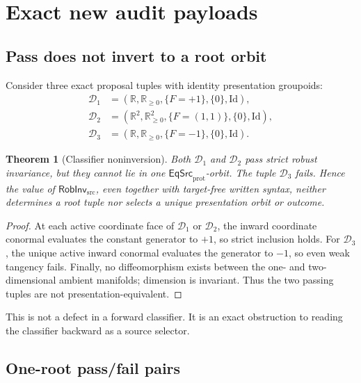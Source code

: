 \documentclass[11pt]{article}
\newtheorem{theorem}{Theorem}
\newcommand{\R}{\mathbb R}
\newcommand{\RobInv}{\mathsf{RobInv}_{\mathrm{src}}}
\newcommand{\EqSrc}{\mathsf{EqSrc}_{\mathrm{prot}}}
\begin{document}
\section{Exact new audit payloads}

\subsection{Pass does not invert to a root orbit}

Consider three exact proposal tuples with identity presentation groupoids:
\begin{align*}
 \mathcal D_1&=(\R,\R_{\geq0},\{F=+1\},\{0\},\mathrm{Id}),\\
 \mathcal D_2&=(\R^2,\R_{\geq0}^2,\{F=(1,1)\},\{0\},\mathrm{Id}),\\
 \mathcal D_3&=(\R,\R_{\geq0},\{F=-1\},\{0\},\mathrm{Id}).
\end{align*}

\begin{theorem}[Classifier noninversion]
Both \(\mathcal D_1\) and \(\mathcal D_2\) pass strict robust invariance,
but they cannot lie in one \(\EqSrc\)-orbit.  The tuple \(\mathcal D_3\)
fails.  Hence the value of \(\RobInv\), even together with target-free written
syntax, neither determines a root tuple nor selects a unique presentation
orbit or outcome.
\end{theorem}

\begin{proof}
At each active coordinate face of \(\mathcal D_1\) or \(\mathcal D_2\), the
inward coordinate conormal evaluates the constant generator to \(+1\), so
strict inclusion holds.  For \(\mathcal D_3\), the unique active inward
conormal evaluates the generator to \(-1\), so even weak tangency fails.
Finally, no diffeomorphism exists between the one- and two-dimensional
ambient manifolds; dimension is invariant.  Thus the two passing tuples are
not presentation-equivalent.
\end{proof}

This is not a defect in a forward classifier.  It is an exact obstruction to
reading the classifier backward as a source selector.

\subsection{One-root pass/fail pairs}
\end{document}
